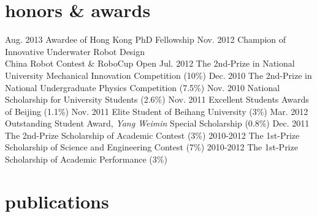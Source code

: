 \documentclass[]{friggeri-cv}
\begin{document}
\section{honors \& awards}

\begin{entrylist}
  \entry
    {Aug. 2013}
    {Awardee of Hong Kong PhD Fellowship}
    {}
    {}
  \entry
    {Nov. 2012}
    {Champion of Innovative Underwater Robot Design \\
    China Robot Contest \& RoboCup Open}
    {}
    {}
  \entry
    {Jul. 2012}
    {The 2nd-Prize in National University Mechanical Innovation Competition}
    {}
    {(10\%)}
  \entry
    {Dec. 2010}
    {The 2nd-Prize in National Undergraduate Physics Competition}
    {}
    {(7.5\%)}
  \entry
    {Nov. 2010}
    {National Scholarship for University Students}
    {}
    {(2.6\%)}
  \entry
    {Nov. 2011}
    {Excellent Students Awards of Beijing}
    {}
    {(1.1\%)}
  \entry
    {Nov. 2011}
    {Elite Student of Beihang University}
    {}
    {(3\%)}
  \entry
    {Mar. 2012}
    {Outstanding Student Award, \textit{Yang Weimin} Special Scholarship}
    {}
    {(0.8\%)}
  \entry
    {Dec. 2011}
    {The 2nd-Prize Scholarship of Academic Contest}
    {}
    {(3\%)}
  \entry
    {2010-2012}
    {The 1st-Prize Scholarship of Science and Engineering Contest}
    {}
    {(7\%)}
  \entry
    {2010-2012}
    {The 1st-Prize Scholarship of Academic Performance}
    {}
    {(3\%)}
\end{entrylist}

\section{publications}

\begin{refsection}
 \nocite{*}
 \printbibliography[sorting=chronological, type=inproceedings, title={Conference}, heading=subbibliography]
\end{refsection}
\end{document}
